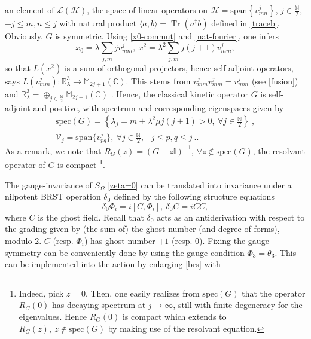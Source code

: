 \documentclass[a4paper,11pt,twoside]{article}
\numberwithin{equation}{section}
\newcommand\bbone{{ \mathbb{I}}}
\DeclareMathOperator{\tr}{Tr}
\theoremstyle{nonumberplain}
\newcounter{and}
\begin{document}
%
an element of $\mathcal{L}(\mathcal{H})$, the space of linear operators on $\mathcal{H}=\text{span}\left\{v^j_{mn}\right\}$, $j\in\frac{\mathbb{N}}{2}$, $-j\le m,n\le j$ with natural product $\langle a,b \rangle = \tr(a^\dag b)$ defined in \eqref{traceb}. Obviously, $G$ is symmetric. Using \eqref{x0-commut} and \eqref{nat-fourier}, one infers%
%
\begin{equation}
x_0=\lambda\sum_{j,m}jv^j_{mm},\ x^2=\lambda^2\sum_{j,m}j(j+1)v^j_{mm},
\end{equation}
%
so that $L(x^2)$ is a sum of orthogonal projectors, hence self-adjoint operators, says $L(v^j_{mm}):\mathbb{R}^3_\lambda\to\mathbb{M}_{2j+1}(\mathbb{C})$. This stems from $v^j_{mm}v^j_{mm}=v^j_{mm}$ (see \eqref{fusion}) and $\mathbb{R}^3_\lambda=\oplus_{j\in\frac{\mathbb{N}}{2}}\mathbb{M}_{2j+1}(\mathbb{C})$ \cite{vit-wal-12}. Hence, the classical kinetic operator $G$ is self-adjoint and positive, with spectrum and corresponding eigenspaces given by%
%
\begin{eqnarray}
&\text{spec}(G)=\left\{ \lambda_j = m + \lambda^2 \mu j(j+1) >0 , \ \forall j \in \frac{\mathbb{N}}{2} \right\} \ , \label{spect-G}& \\
&\mathcal{V}_{j} = \text{span}\{ v^j_{pq} \} , \ \forall  j \in \frac{\mathbb{N}}{2} , -j\le p,q\le j \ . \label{eigensp-G}.&
\end{eqnarray}
%
As a remark, we note that $R_G(z)=(G-z\bbone)^{-1}$, $\forall z\notin\text{spec}(G)$, the resolvant operator of $G$ is compact {\footnote{Indeed, pick $z=0$. Then, one easily realizes from $\text{spec}(G)$ that the operator $R_G(0)$ has decaying spectrum at $j\to\infty$, still with finite degeneracy for the eigenvalues. Hence $R_G(0)$ is compact which extends to $R_G(z),\ z\notin\text{spec}(G)$ by making use of the resolvant equation.}}.\par%
%
The gauge-invariance of $S_\Omega$ \eqref{zeta=0} can be translated into invariance under a nilpotent BRST operation $\delta_0$ defined by the following structure equations \cite{MVW13}%
%
\begin{equation}
\delta_0\Phi_i=i[C,\Phi_i],\ \delta_0C=iCC\label{brs},
\end{equation}
%
where $C$ is the ghost field. Recall that $\delta_0$ acts as an antiderivation with respect to the grading given by (the sum of) the ghost number (and degree of forms), modulo 2. $C$ (resp. $\Phi_i$) has ghost number $+1$ (resp. $0$). Fixing the gauge symmetry can be conveniently done by using the gauge condition $\Phi_3=\theta_3$. This can be implemented into the action by enlarging \eqref{brs} with%
\end{document}
